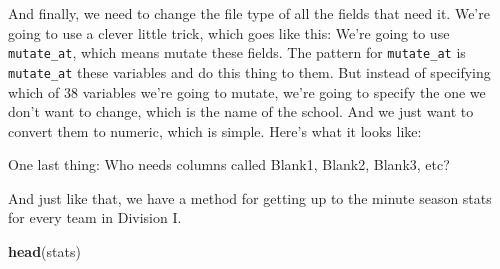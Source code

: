 \documentclass[
]{book}
\newenvironment{Shaded}{\begin{snugshade}}{\end{snugshade}}
\newcommand{\KeywordTok}[1]{\textcolor[rgb]{0.13,0.29,0.53}{\textbf{#1}}}
\newcommand{\NormalTok}[1]{#1}
\newcommand{\OperatorTok}[1]{\textcolor[rgb]{0.81,0.36,0.00}{\textbf{#1}}}
\newcommand{\StringTok}[1]{\textcolor[rgb]{0.31,0.60,0.02}{#1}}
\begin{document}
And finally, we need to change the file type of all the fields that need it. We're going to use a clever little trick, which goes like this: We're going to use \texttt{mutate\_at}, which means mutate these fields. The pattern for \texttt{mutate\_at} is \texttt{mutate\_at} these variables and do this thing to them. But instead of specifying which of 38 variables we're going to mutate, we're going to specify the one we don't want to change, which is the name of the school. And we just want to convert them to numeric, which is simple. Here's what it looks like:

\begin{Shaded}
\end{Shaded}

One last thing: Who needs columns called Blank1, Blank2, Blank3, etc?

\begin{Shaded}
\end{Shaded}

And just like that, we have a method for getting up to the minute season stats for every team in Division I.

\begin{Shaded}
\begin{Highlighting}[]
\KeywordTok{head}\NormalTok{(stats)}
\end{Highlighting}
\end{Shaded}
\end{document}
